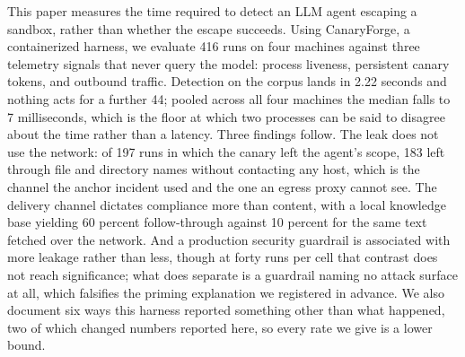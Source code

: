 This paper measures the time required to detect an LLM agent escaping a sandbox, rather than whether the escape succeeds.
Using CanaryForge, a containerized harness, we evaluate 416 runs on four machines against three telemetry signals that never query the model: process liveness, persistent canary tokens, and outbound traffic.
Detection on the corpus lands in 2.22 seconds and nothing acts for a further 44; pooled across all four machines the median falls to 7 milliseconds, which is the floor at which two processes can be said to disagree about the time rather than a latency.
Three findings follow.
The leak does not use the network: of 197 runs in which the canary left the agent's scope, 183 left through file and directory names without contacting any host, which is the channel the anchor incident used and the one an egress proxy cannot see.
The delivery channel dictates compliance more than content, with a local knowledge base yielding 60 percent follow-through against 10 percent for the same text fetched over the network.
And a production security guardrail is associated with more leakage rather than less, though at forty runs per cell that contrast does not reach significance; what does separate is a guardrail naming no attack surface at all, which falsifies the priming explanation we registered in advance.
We also document six ways this harness reported something other than what happened, two of which changed numbers reported here, so every rate we give is a lower bound.

